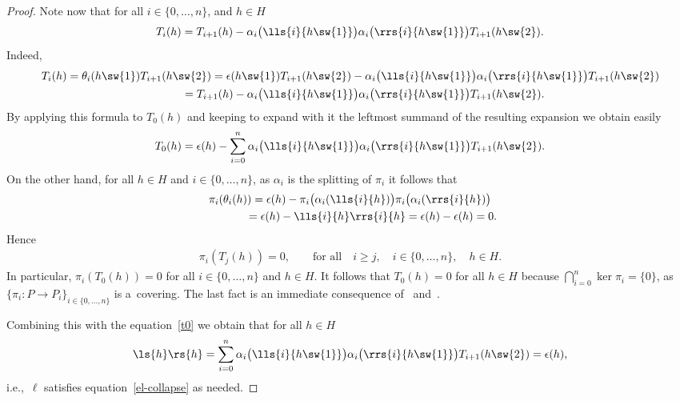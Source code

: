 \begin{proof}
Note now that for all $i\in\{0,\ldots,n\}$, and $h\in H$
\begin{gather*}
T_i(h)=T_{i+1}(h)-\alpha_i\big(\lls{i}{h\sw{1}}\big)\alpha_i\big(\rrs{i}{h\sw{1}}\big)T_{i+1}(h\sw{2}).
\end{gather*}
Indeed,
\begin{gather*}
T_i(h) =\theta_i(h\sw{1})T_{i+1}(h\sw{2})
 ={\epsilon}(h\sw{1})T_{i+1}(h\sw{2})-\alpha_i\big(\lls{i}{h\sw{1}}\big)\alpha_i\big(\rrs{i}{h\sw{1}}\big)T_{i+1}(h\sw{2})
\\
\phantom{T_i(h)}
 =T_{i+1}(h)-\alpha_i\big(\lls{i}{h\sw{1}}\big)\alpha_i\big(\rrs{i}{h\sw{1}}\big)T_{i+1}(h\sw{2}).
\end{gather*}
By applying this formula to $T_0(h)$ and keeping to expand with it the leftmost summand of the resulting expansion we
obtain easily
\begin{gather}
\label{t0}
T_0(h)={\epsilon}(h)-\sum\limits_{i=0}^n\alpha_i\big(\lls{i}{h\sw{1}}\big)\alpha_i\big(\rrs{i}{h\sw{1}}\big)T_{i+1}(h\sw{2}).
\end{gather}
On the other hand, for all $h\in H$ and $i\in\{0,\ldots,n\}$, as $\alpha_i$ is the splitting of $\pi_i$ it follows that
\begin{gather*}
\pi_i(\theta_i(h))  ={\epsilon}(h)-\pi_i\big(\alpha_i(\lls{i}{h})\big)\pi_i\big(\alpha_i(\rrs{i}{h})\big)
\\
\phantom{\pi_i(\theta_i(h))}
={\epsilon}(h)-\lls{i}{h}\rrs{i}{h} ={\epsilon}(h)-{\epsilon}(h)
 =0.
\end{gather*}
Hence
\begin{gather*}
\pi_i(T_j(h))=0,
\qquad
\text{for all}
\quad
i\geq j,
\quad
i\in\{0,\ldots,n\},
\quad
h\in H.
\end{gather*}
In particular, $\pi_i(T_0(h))=0$ for all $i\in\{0,\ldots,n\}$ and $h\in H$.
It follows that $T_0(h)=0$ for all $h\in H$ because $\bigcap_{i=0}^n\ker\pi_i=\{0\}$, as $\{\pi_i:P\rightarrow
P_i\}_{i\in\{0,\ldots,n\}}$ is a~covering.
The last fact is an immediate consequence of~\cite[Theorem~3.3]{hkmz11} and~\cite[Corollary~3.7]{hkmz11}.

Combining this with the equation~\eqref{t0} we obtain that for all $h\in H$
\begin{gather*}
\ls{h}\rs{h}=\sum\limits_{i=0}^n\alpha_i\big(\lls{i}{h\sw{1}}\big)\alpha_i\big(\rrs{i}{h\sw{1}}\big)T_{i+1}(h\sw{2})={\epsilon}(h),
\end{gather*}
i.e.,~$\ell$ satisf\/ies equation~\eqref{el-collapse} as needed.
\end{proof}

